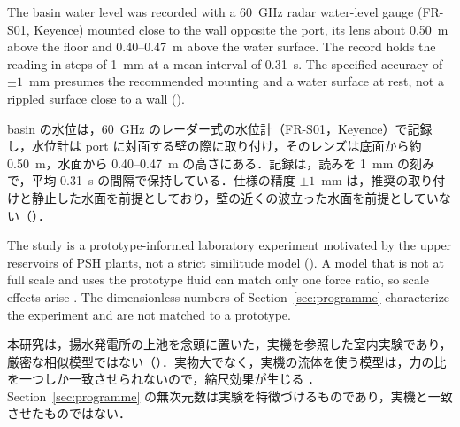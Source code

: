 \begin{en}[M1-4]
The basin water level was recorded with a 60~GHz radar water-level gauge (FR-S01, Keyence) mounted close to the wall opposite the port, its lens about 0.50~m above the floor and 0.40--0.47~m above the water surface. The record holds the reading in steps of 1~mm at a mean interval of 0.31~s. The specified accuracy of $\pm 1$~mm presumes the recommended mounting and a water surface at rest, not a rippled surface close to a wall ().
\end{en}
\begin{ja}
basin の水位は，60~GHz のレーダー式の水位計（FR-S01，Keyence）で記録し，水位計は port に対面する壁の際に取り付け，そのレンズは底面から約 0.50~m，水面から 0.40--0.47~m の高さにある．記録は，読みを 1~mm の刻みで，平均 0.31~s の間隔で保持している．仕様の精度 $\pm 1$~mm は，推奨の取り付けと静止した水面を前提としており，壁の近くの波立った水面を前提としていない（）．
\end{ja}


\begin{en}[M1-5]
The study is a prototype-informed laboratory experiment motivated by the upper reservoirs of PSH plants, not a strict similitude model (). A model that is not at full scale and uses the prototype fluid can match only one force ratio, so scale effects arise \citep{hellerScaleEffectsPhysical2011}. The dimensionless numbers of Section~\ref{sec:programme} characterize the experiment and are not matched to a prototype.
\end{en}
\begin{ja}
本研究は，揚水発電所の上池を念頭に置いた，実機を参照した室内実験であり，厳密な相似模型ではない（）．実物大でなく，実機の流体を使う模型は，力の比を一つしか一致させられないので，縮尺効果が生じる \citep{hellerScaleEffectsPhysical2011}．Section~\ref{sec:programme} の無次元数は実験を特徴づけるものであり，実機と一致させたものではない．
\end{ja}

